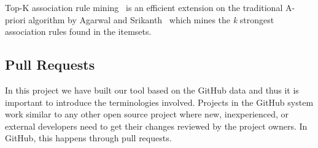 \begin{table}[htbp]
  \centering
  \caption{A sample snapshot of check-ins in a repository.}
  \hspace{1cm}
  \label{table:checkins_snapshot}
\end{table}


Top-K association rule mining~\cite{fournier2012mining} is an efficient extension on the traditional A-priori algorithm by Agarwal and Srikanth~\cite{Agrawal} which mines the \textit{k} strongest association rules found in the itemsets.


\subsection{Pull Requests}


In this project we have built our tool based on the GitHub data and thus it is important to introduce the terminologies involved. Projects in the GitHub system work similar to any other open source project where new, inexperienced, or external developers need to get their changes reviewed by the project owners. In GitHub, this happens through pull requests.\\

